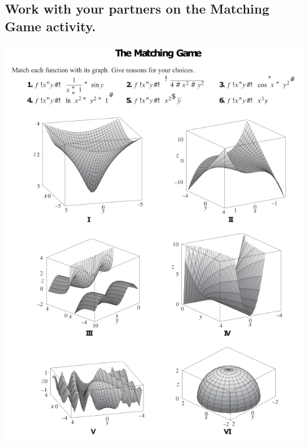\subsection*{Work with your partners on the \textbf{Matching Game} activity.}

\pagebreak

\includegraphics[]{Matching-Game.png}



